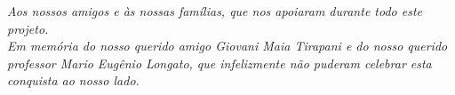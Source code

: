 \begin{dedicatoria}
   \vspace*{\fill}
   \centering
   \noindent
   \textit{Aos nossos amigos e às nossas famílias, que nos apoiaram durante todo este projeto.\\[1em]
   Em memória do nosso querido amigo Giovani Maia Tirapani e do nosso querido professor Mario Eugênio Longato, que infelizmente não puderam celebrar esta conquista ao nosso lado.}
   \vspace*{\fill}
\end{dedicatoria}
